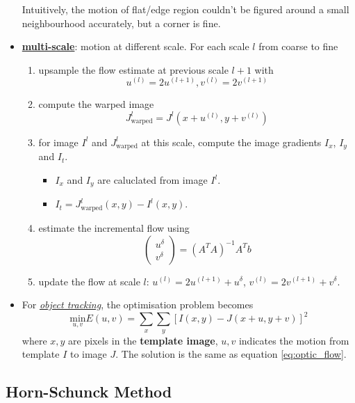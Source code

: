 \documentclass[twocolumn,landscape,10pt]{article}
\theoremstyle{definition}
\begin{document}
\begin{itemize}
        Intuitively, the motion of flat/edge region couldn't be figured around a
        small neighbourhood accurately, but a corner is fine.
    \item \underline{\textbf{multi-scale}}: motion at different scale. For each
        scale $l$ from coarse to fine
        \begin{enumerate}
            \item upsample the flow estimate at previous scale $l+1$ with
                \[
                    u^{(l)}=2u^{(l+1)},
                    v^{(l)}=2v^{(l+1)}
                \]
            \item compute the warped image
                \[
                    J_\text{warped}^l=J^l(x+u^{(l)},y+v^{(l)})
                \]
            \item for image $I^l$ and $J_\text{warped}^l$ at this scale, compute
                the image gradients $I_x$, $I_y$ and $I_t$.
                \begin{itemize}
                    \item $I_x$ and $I_y$ are caluclated from image $I^l$.
                    \item $I_t=J_\text{warped}^l(x,y)-I^l(x,y)$.
                \end{itemize} 
            \item estimate the incremental flow using
                \[
                    \begin{pmatrix}
                        u^\delta \\
                        v^\delta
                    \end{pmatrix} 
                    =
                    {(A^TA)}^{-1}A^Tb
                \]
            \item update the flow at scale $l$: $u^{(l)}=2u^{(l+1)}+u^\delta$,
                $v^{(l)}=2v^{(l+1)}+v^\delta$.
        \end{enumerate} 
    \item For \underline{\emph{object tracking}}, the optimisation problem
        becomes
        \[
            \underset{u,v}{\text{min}}E(u,v)=\sum_x\sum_y
            {[I(x,y)-J(x+u,y+v)]}^{2}
        \]
        where $x,y$ are pixels in the \textbf{template image}, $u,v$
        indicates the motion from template $I$ to image $J$.
        The solution is the same as equation \eqref{eq:optic_flow}.
\end{itemize} 

\subsection{Horn-Schunck Method}
\end{document}
